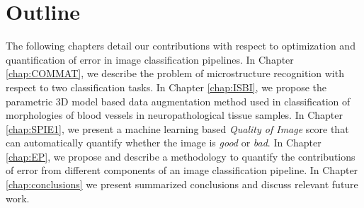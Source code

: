 \section{Outline}
The following chapters detail our contributions with respect to optimization and quantification of error in image classification pipelines.
In Chapter \ref{chap:COMMAT}, we describe the problem of microstructure recognition with respect to two classification tasks. 
In Chapter \ref{chap:ISBI}, we propose the parametric 3D model based data augmentation method used in classification of morphologies of blood vessels in neuropathological tissue samples. 
In Chapter \ref{chap:SPIE1}, we present a machine learning based \textit{Quality of Image} score that can automatically quantify whether the image is \textit{good} or \textit{bad}.
In Chapter \ref{chap:EP}, we propose and describe a methodology to quantify the contributions of error from different components of an image classification pipeline. 
In Chapter \ref{chap:conclusions} we present summarized conclusions and discuss relevant future
work. 